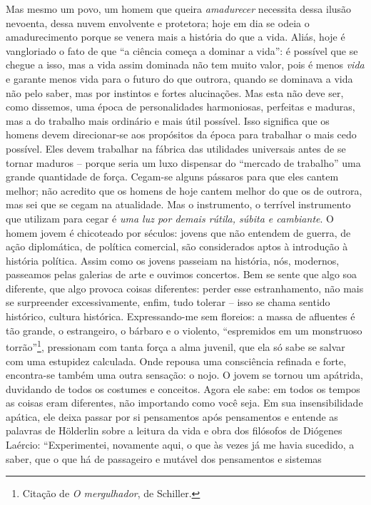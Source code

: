 Mas mesmo um povo, um homem que queira \emph{amadurecer} necessita dessa
ilusão nevoenta, dessa nuvem envolvente e protetora; hoje em dia se
odeia o amadurecimento porque se venera mais a história do que a vida.
Aliás, hoje é vangloriado o fato de que ``a ciência começa a dominar a
vida'': é possível que se chegue a isso, mas a vida assim dominada não
tem muito valor, pois é menos \emph{vida} e garante menos vida para o
futuro do que outrora, quando se dominava a vida não pelo saber, mas por
instintos e fortes alucinações. Mas esta não deve ser, como dissemos,
uma época de personalidades harmoniosas, perfeitas e maduras, mas a do
trabalho mais ordinário e mais útil possível. Isso significa que os
homens devem direcionar-se aos propósitos da época para trabalhar o mais
cedo possível. Eles devem trabalhar na fábrica das utilidades universais
antes de se tornar maduros -- porque seria um luxo dispensar do
``mercado de trabalho'' uma grande quantidade de força. Cegam-se alguns
pássaros para que eles cantem melhor; não acredito que os homens de hoje
cantem melhor do que os de outrora, mas sei que se cegam na atualidade.
Mas o instrumento, o terrível instrumento que utilizam para cegar é
\emph{uma luz por demais rútila, súbita e cambiante}. O homem jovem é
chicoteado por séculos: jovens que não entendem de guerra, de ação
diplomática, de política comercial, são considerados aptos à introdução
à história política. Assim como os jovens passeiam na história, nós,
modernos, passeamos pelas galerias de arte e ouvimos concertos. Bem se
sente que algo soa diferente, que algo provoca coisas diferentes: perder
esse estranhamento, não mais se surpreender excessivamente, enfim, tudo
tolerar -- isso se chama sentido histórico, cultura histórica.
Expressando-me sem floreios: a massa de afluentes é tão grande, o
estrangeiro, o bárbaro e o violento, ``espremidos em um monstruoso
torrão''\footnote{Citação de \emph{O mergulhador}, de Schiller.},
pressionam com tanta força a alma juvenil, que ela só sabe se salvar com
uma estupidez calculada. Onde repousa uma consciência refinada e forte,
encontra-se também uma outra sensação: o nojo. O jovem se tornou um
apátrida, duvidando de todos os costumes e conceitos. Agora ele sabe: em
todos os tempos as coisas eram diferentes, não importando como você
seja. Em sua insensibilidade apática, ele deixa passar por si
pensamentos após pensamentos e entende as palavras de Hölderlin sobre a
leitura da vida e obra dos filósofos de Diógenes Laércio:
``Experimentei, novamente aqui, o que às vezes já me havia sucedido, a
saber, que o que há de passageiro e mutável dos pensamentos e sistemas
